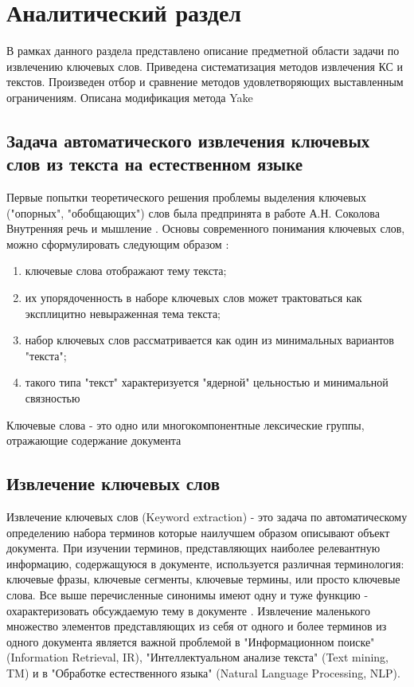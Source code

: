 \section{Аналитический раздел}
В рамках данного раздела представлено описание предметной области задачи по извлечению ключевых слов. Приведена систематизация методов извлечения КС и текстов.
Произведен отбор и сравнение методов удовлетворяющих выставленным ограничениям.
Описана модификация метода Yake

\subsection{Задача автоматического извлечения ключевых слов из текста на естественном языке}

Первые попытки теоретического решения проблемы выделения ключевых ("опорных", "обобщающих") слов была предпринята в работе А.Н. Соколова Внутренняя речь и мышление \cite{6}.
Основы современного понимания ключевых слов, можно сформулировать следующим образом \cite{7}:
\begin{enumerate}
	\item ключевые слова отображают тему текста;
	\item их упорядоченность в наборе ключевых слов может трактоваться как эксплицитно невыраженная тема текста;
	\item набор ключевых слов рассматривается как один из минимальных вариантов "текста";
	\item такого типа "текст" характеризуется "ядерной" цельностью и минимальной связностью
\end{enumerate}

Ключевые слова - это одно или многокомпонентные лексические группы, отражающие содержание документа \cite{3}

\subsection{Извлечение ключевых слов}

Извлечение ключевых слов (Keyword extraction) - это задача по автоматическому определению набора терминов которые наилучшем образом описывают объект документа.
При изучении терминов, представляющих наиболее релевантную информацию, содержащуюся в документе, используется различная терминология: ключевые фразы, ключевые сегменты, ключевые термины, или просто ключевые слова.
Все выше перечисленные синонимы имеют одну и туже функцию - охарактеризовать обсуждаемую тему в документе \cite{4}.
Извлечение маленького множество элементов представляющих из себя от одного и более терминов из одного документа является важной проблемой в "Информационном поиске" (Information Retrieval, IR), "Интеллектуальном анализе текста" (Text mining, TM) и в "Обработке естественного языка" (Natural Language Processing, NLP).

